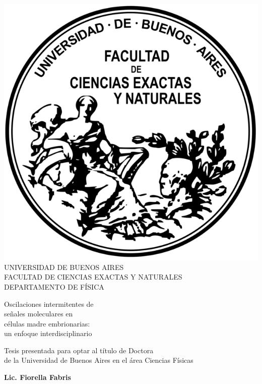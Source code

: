 \documentclass[./main.tex]{subfiles}
\begin{document}
\thispagestyle{empty}
\begin{adjustwidth}{-0.5in}{-0.5in}

{
\begin{center}
\includegraphics[scale=1]{Logo-fcenuba.png}\\
{\Large UNIVERSIDAD DE BUENOS AIRES}\\
{FACULTAD DE CIENCIAS EXACTAS Y NATURALES}\\
DEPARTAMENTO DE FÍSICA \\
\vspace{1.2cm} 

{\Huge {} Oscilaciones intermitentes de\\señales moleculares en\\células madre embrionarias:}{\huge {} \\un enfoque interdisciplinario\\}
\vspace{1cm}

{\large Tesis presentada para optar al título de Doctora\\de la Universidad de Buenos Aires en el área Ciencias Físicas}\\
\vspace{0.3cm}

{\Large\textbf{Lic. Fiorella Fabris}}


\end{center}}
\end{adjustwidth}
\end{document}
